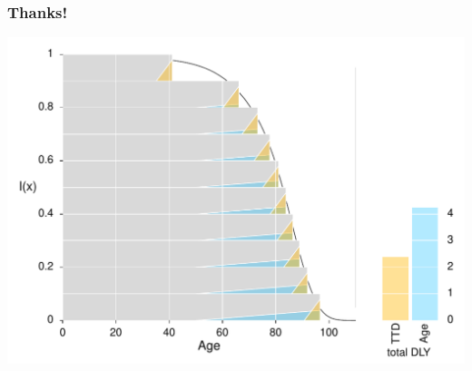 \documentclass[20pt]{beamer}
\begin{document}
%

\begin{frame}
\frametitle{Thanks!}
\begin{center}
\includegraphics[width=\linewidth]{Figures/Japan2010.pdf}
\end{center}
\end{frame}

\end{document}
